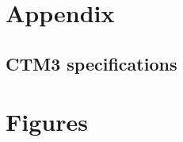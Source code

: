 \appendix
\chapter{Appendix}

\section{CTM3 specifications}\label{app:CTM3}






\cleardoublepage


\chapter{Figures}
\cleardoublepage
